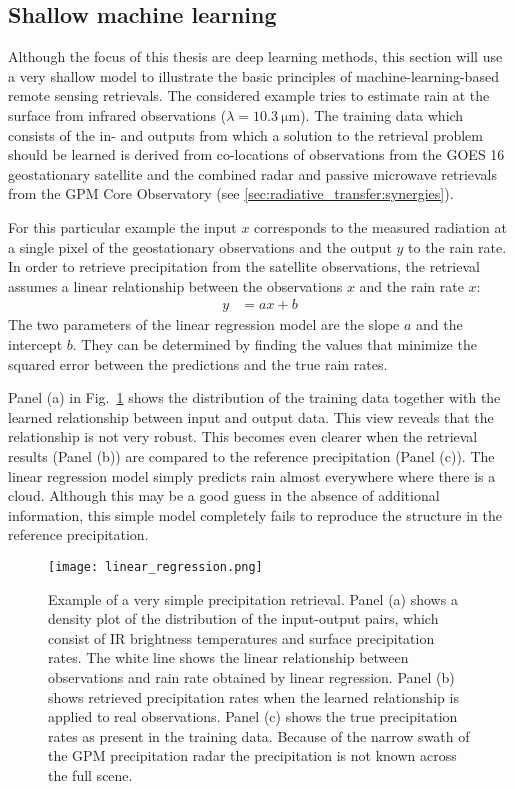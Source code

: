 \subsection{Shallow machine learning}

Although the focus of this thesis are deep learning methods, this section will
use a very shallow model to illustrate the basic principles of
machine-learning-based remote sensing retrievals. The considered example tries
to estimate rain at the surface from infrared observations ($\lambda =
\SI{10.3}{\micro \meter}$). The training data which consists of the in- and
outputs from which a solution to the retrieval problem should be learned is
derived from co-locations of observations from the GOES 16 geostationary
satellite and the combined radar and passive microwave retrievals from the GPM
Core Observatory (see \ref{sec:radiative_transfer:synergies}).

For this particular example the input $x$ corresponds to the measured
radiation at a single pixel of the geostationary observations and the output
$y$ to the rain rate. In order to retrieve precipitation from the
satellite observations, the retrieval assumes a linear relationship between the
observations $x$ and the rain rate $x$:
\begin{align}
  y &= a x + b
\end{align}
The two parameters of the linear regression model are the slope $a$ and the
intercept $b$. They can be determined by finding the values that minimize the
squared error between the predictions and the true rain rates.

Panel (a) in Fig.~\ref{fig:machine_learning:linear_regression} shows the
distribution of the training data together with the learned relationship between
input and output data. This view reveals that the relationship is not very
robust. This becomes even clearer when the retrieval results (Panel (b)) are
compared to the reference precipitation (Panel (c)). The linear regression model
simply predicts rain almost everywhere where there is a cloud. Although this may
be a good guess in the absence of additional information, this simple model
completely fails to reproduce the structure in the reference precipitation.

\begin{figure}
  \centering
  \texttt{[image: linear\_regression.png]}
  \caption{Example of a very simple precipitation retrieval. Panel (a) shows a
    density plot of the distribution of the input-output pairs, which consist of
    IR brightness temperatures and surface precipitation rates. The white line
    shows the linear relationship between observations and rain rate obtained by
    linear regression. Panel (b) shows retrieved precipitation rates when the
    learned relationship is applied to real observations. Panel (c) shows the
    true precipitation rates as present in the training data. Because of the
    narrow swath of the GPM precipitation radar the precipitation is not known
    across the full scene. }
  \label{fig:machine_learning:linear_regression}
\end{figure}

